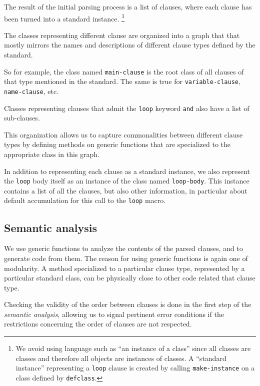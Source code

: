 The result of the initial parsing process is a list of clauses, where
each clause has been turned into a standard instance.%
\footnote{We avoid using language such as ``an instance of a \clos{}
  class'' since all classes are \clos{} classes and therefore all
  \commonlisp{} objects are instances of \clos{} classes.  A
  ``standard instance'' representing a \texttt{loop} clause is created
  by calling \texttt{make-instance} on a class defined by
  \texttt{defclass}.}

The classes representing different clause are organized into a graph
that that mostly mirrors the names and descriptions of different
clause types defined by the \commonlisp{} standard.

So for example, the class named \texttt{main-clause} is
the root class of all clauses of that type mentioned in the standard.
The same is true for \texttt{variable-clause}, \texttt{name-clause},
etc.

Classes representing clauses that admit the \texttt{loop} keyword
\texttt{and} also have a list of sub-clauses.

This organization allows us to capture commonalities between different
clause types by defining methods on generic functions that are
specialized to the appropriate class in this graph.

In addition to representing each clause as a standard instance, we
also represent the \texttt{loop} body itself as an instance of the
class named \texttt{loop-body}.  This instance contains a list of all
the clauses, but also other information, in particular about default
accumulation for this call to the \texttt{loop} macro.

\subsection{Semantic analysis}
\label{sec-our-technique-semantic-analysis}

We use generic functions to analyze the contents of the parsed
clauses, and to generate code from them.  The reason for using generic
functions is again one of modularity.  A method specialized to a
particular clause type, represented by a particular standard class,
can be physically close to other code related that clause type.

Checking the validity of the order between clauses is done in the
first step of the \emph{semantic analysis}, allowing us to signal
pertinent error conditions if the restrictions concerning the order of
clauses are not respected.

